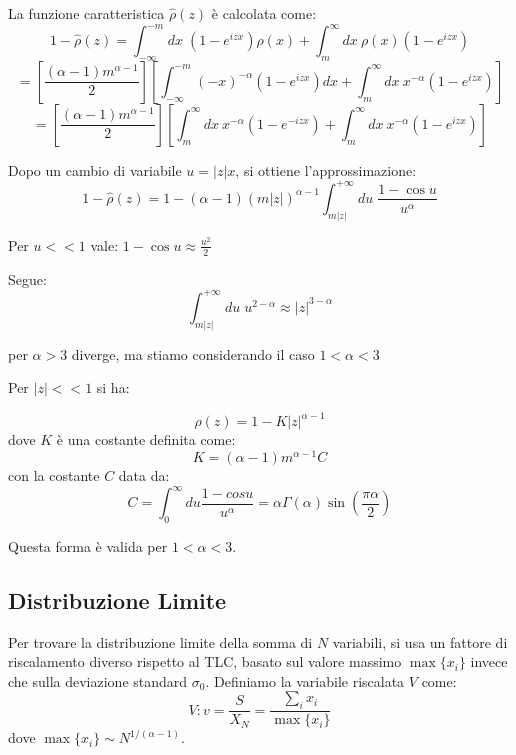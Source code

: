 La funzione caratteristica $\hat{\rho}(z)$ è calcolata come:
\begin{equation}
1-\hat{\rho}(z)=\int_{-\infty}^{-m}dx \; (1-e^{izx})\rho(x)+\int_{m}^{\infty}dx~\rho(x)(1-e^{izx})
\end{equation}
\begin{equation}
=\left [\frac{(\alpha-1)m^{\alpha-1}}{2}\right ] \left [\int_{-\infty}^{-m}(-x)^{-\alpha}(1-e^{izx})dx+\int_{m}^{\infty}dx~x^{-\alpha}(1-e^{izx})\right ] 
\end{equation}
\begin{equation}
=\left [\frac{(\alpha-1)m^{\alpha-1}}{2}\right ] \left [\int_{m}^{\infty}dx~x^{-\alpha}(1-e^{-izx})+\int_{m}^{\infty}dx~x^{-\alpha}(1-e^{izx})\right ] 
\end{equation}

Dopo un cambio di variabile $u=|z|x$, si ottiene l'approssimazione:
\begin{equation}
1-\hat{\rho}(z)=1-(\alpha-1)(m|z|)^{\alpha-1}\int_{m|z|}^{+\infty}du \; \frac{1-\cos u}{u^{\alpha}}
\end{equation}

Per $u<<1$ vale: $1-\cos u \approx \frac{u^2}{2}$ 

Segue:
\begin{equation}
\int_{m|z|}^{+\infty}du \; u^{2-\alpha} \approx |z|^{3-\alpha}
\end{equation}

per $\alpha >3$ diverge, ma stiamo considerando il caso $1 < \alpha < 3$

Per $|z|<<1$ si ha:

\begin{equation}
\hat{\rho}(z)=1-K|z|^{\alpha-1}
\end{equation}
dove $K$ è una costante definita come:
\begin{equation}
K=(\alpha-1)m^{\alpha-1}C
\end{equation}
con la costante $C$ data da:
\begin{equation}
C=\int_{0}^{\infty}du\frac{1-cosu}{u^{\alpha}}= \alpha \Gamma(\alpha)\sin(\frac{\pi \alpha}{2})
\end{equation}

Questa forma è valida per $1 < \alpha < 3$.

\subsection{Distribuzione Limite}

Per trovare la distribuzione limite della somma di $N$ variabili, si usa un fattore di riscalamento diverso rispetto al TLC, basato sul valore massimo $\max\{x_i\}$ invece che sulla deviazione standard $\sigma_0$. Definiamo la variabile riscalata $V$ come:
\begin{equation}
V:v=\frac{S}{X_{N}}=\frac{\sum_{i}x_{i}}{\max\{x_{i}\}}
\end{equation}
dove $\max\{x_i\} \sim N^{1/(\alpha-1)}$.

